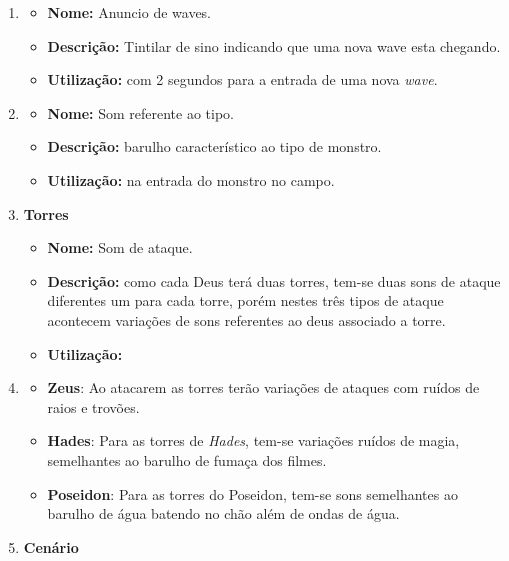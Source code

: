 \documentclass[11pt]{article} %
\begin{document}
\begin{enumerate}
\item \begin{itemize}
\item \textbf{Nome:} Anuncio de waves.
\item \textbf{Descrição:} Tintilar de sino indicando que uma nova wave esta chegando. 
\item \textbf{Utilização:} com 2 segundos para a entrada de uma nova \textit{wave}.
\end{itemize}
\item \begin{itemize}
\item \textbf{Nome:} Som referente ao tipo.
\item \textbf{Descrição:} barulho característico ao tipo de monstro.
\item \textbf{Utilização:} na entrada do monstro no campo.
\end{itemize}
\item {\LARGE \textbf{Torres}}
\begin{itemize}
\item \textbf{Nome:} Som de ataque.
\item \textbf{Descrição:} como cada Deus terá duas torres, tem-se duas sons de ataque diferentes um para cada torre, porém nestes três tipos de ataque acontecem variações de sons referentes ao deus associado a torre.
\item \textbf{Utilização:} 
\end{itemize}
\item \begin{itemize}
\item \textbf{Zeus}: Ao atacarem as torres terão variações de ataques com ruídos de raios e trovões.
\item \textbf{Hades}: Para as torres de \textit{Hades}, tem-se variações ruídos de magia, semelhantes ao barulho de fumaça dos filmes.
\item \textbf{Poseidon}: Para as torres do Poseidon, tem-se sons semelhantes ao barulho de água batendo no chão além de ondas de água.
\end{itemize}
\item {\LARGE \textbf{Cenário}}


\end{enumerate}
\end{document}
